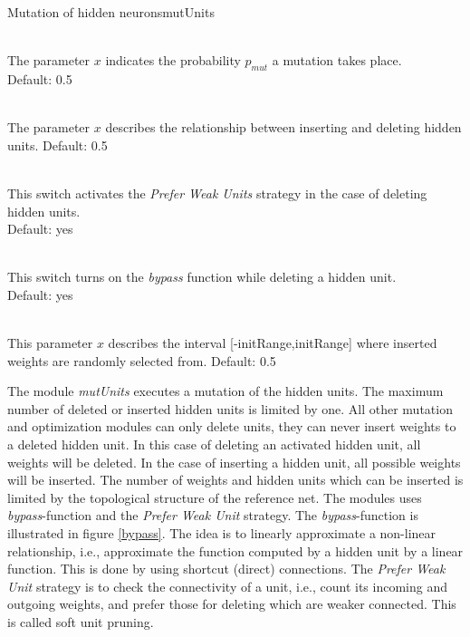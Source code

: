 \begin{moduledoc}{Mutation of hidden neurons}{mutUnits}
  \item[\KeyWord{probMutUnits} \optParam{ x } ]~\\
    The parameter $x$ indicates the probability $p_{mut}$ a mutation takes 
    place.\\
    Default: 0.5
  \item[\KeyWord{probMutUnitsSplit} \optParam{ x } ]~\\
    The parameter $x$ describes the relationship between inserting and deleting
    hidden units.
    Default: 0.5
  \item[\KeyWord{PWU} \optParam{ x } ]~\\
    This switch activates the  {\it Prefer Weak Units} strategy in the case of deleting 
    hidden units.\\
    Default: yes
  \item[\KeyWord{bypass} \optParam{ x } ]~\\
    This switch turns on the {\it bypass} function while deleting a hidden unit.\\
    Default: yes
  \item[\KeyWord{initRange} \optParam{ x } ]~\\
    This parameter $x$ describes the interval [-initRange,initRange] where 
    inserted weights are randomly selected from.
    Default: 0.5
\end{moduledoc}

The module {\it mutUnits} executes a mutation of the hidden units.
The maximum number of deleted or inserted hidden units is limited by one.
All other mutation and optimization modules can only delete units, they can
never insert weights to a deleted hidden unit.
In this case of deleting an activated hidden unit, all weights will be deleted.
In the case of inserting a hidden unit, all possible weights will be inserted.
The number of weights and hidden units which can be inserted is limited by the 
topological structure of the reference net.
The modules uses {\it bypass}-function and the {\it Prefer Weak Unit} strategy.
The {\it bypass}-function is illustrated in figure \ref{bypass}. The idea is to
linearly approximate a non-linear relationship, i.e., approximate the function
computed by a hidden
unit by a linear function. This is done by using shortcut (direct) connections.
The  {\it Prefer Weak Unit} strategy is to check the connectivity of a unit, i.e.,
count its incoming and outgoing weights, and prefer those for deleting which are weaker
connected. This is called soft unit pruning. 

